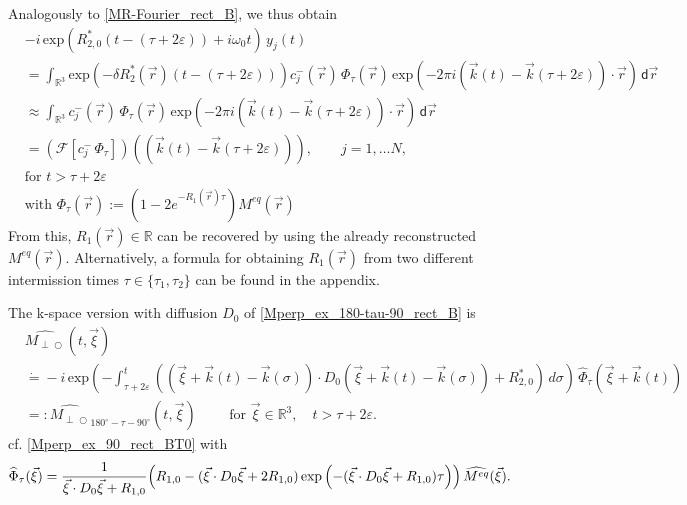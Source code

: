 \documentclass{ws-m3as}
\newcommand{\kspace}[1]{{#1}}
\def\Mpp{M_{\perp\!\!\!\!\!\bigcirc}}
\def\Mphp{\widehat{\Mpp}}
\newcommand\taup{\varepsilon}
\newcommand{\eexp}[1]{\text{exp}\left(#1\right)}
\newcommand{\revisionown}[1]{{ #1}}
\begin{document}
Analogously to 
\eqref{MR-Fourier_rect_B}, 
we thus obtain  
\begin{equation}\label{obsPhi1_rect_B} 
\begin{aligned}
&-i\,\eexp{R_{2,0}^*(t-(\tau+2\taup))+ i\omega_0t} \, y_j(t)\\ 
&= \int_{\mathbb{R}^3} \eexp{-\delta R_2^*(\vec r)(t-(\tau+2\taup))} c^-_j(\vec r)\,\Phi_\tau(\vec r) \, \eexp{-2\pi i ({\vec k}(t)-{\vec k}(\tau+2\taup))\cdot{\vec r}}  \,\textsf{d}\vec r\\
&\approx \int_{\mathbb{R}^3} c^-_j(\vec r)\,\Phi_\tau(\vec r) \, \eexp{-2\pi i ({\vec k}(t)-{\vec k}(\tau+2\taup))\cdot{\vec r}}  \,\textsf{d}\vec r\\
&=(\mathcal{F}[c^-_j\,\Phi_\tau])(({\vec k}(t)-{\vec k}(\tau+2\taup)))
,\qquad j=1,\ldots N,
\\
&\text{for }t>\tau+2\taup\\
&\text{with }\Phi_\tau(\vec r):=(1-2e^{-R_1(\vec r)\tau})M^{eq}(\vec r)
\end{aligned}
\end{equation}
From this, $R_1(\vec r)\in\mathbb{R}$ can be recovered by using the already reconstructed $M^{eq}(\vec r)$. \revisionown{Alternatively, a formula for obtaining $R_1(\vec r)$ from two different intermission times $\tau\in\{\tau_1,\tau_2\}$ can be found in the appendix. 
}

\kspace{
The k-space version with diffusion $D_0$ of \eqref{Mperp_ex_180-tau-90_rect_B} is 
\begin{equation}\label{Mperp_ex_180-tau-90_rect_BT0}
\begin{aligned}
&\Mphp(t,\vec\xi)\\
&\dot{=} 
-i\,\eexp{-\int_{\tau+2\taup}^t((\vec\xi+\vec k(t)-\vec k(\sigma))\cdot D_0(\vec\xi+\vec k(t)-\vec k(\sigma))+R_{2,0}^*)\, d\sigma}\, \widehat{\Phi}_\tau(\vec\xi+\vec k(t))
\\
&=:\widehat{\Mpp}_{180^\circ-\tau-90^\circ}(t,\vec\xi)\qquad
\text{ for }\vec\xi\in\mathbb{R}^3, \quad t>\tau+2\taup.
\end{aligned}
\end{equation}
cf. \eqref{Mperp_ex_90_rect_BT0} with 
\[
\widehat{\Phi}_\tau(\vec\xi)=
\frac{1}{\vec\xi\cdot D_0\vec\xi+R_{1,0}}
\Bigl(R_{1,0}-(\vec\xi\cdot D_0\vec\xi+2R_{1,0})\, \eexp{-(\vec\xi\cdot D_0\vec\xi+R_{1,0})\tau}\Bigr)\,\widehat{M^{eq}}(\vec\xi).
\]
}
\end{document}
